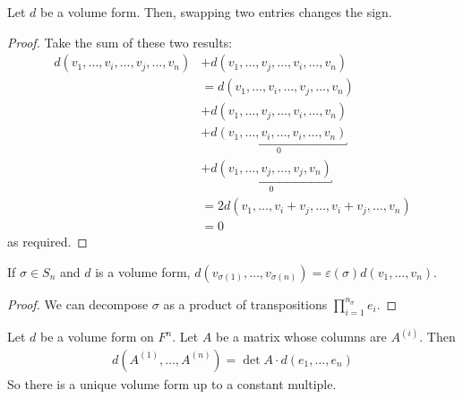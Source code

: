 \begin{lemma}
	Let $d$ be a volume form.
	Then, swapping two entries changes the sign.
\end{lemma}
\begin{proof}
	Take the sum of these two results:
	\begin{align*}
		d(v_1, \dots, v_i, \dots, v_j, \dots, v_n) & + d(v_1, \dots, v_j, \dots, v_i, \dots, v_n) \\
		& = d(v_1, \dots, v_i, \dots, v_j, \dots, v_n) \\
		& + d(v_1, \dots, v_j, \dots, v_i, \dots, v_n) \\
		& + \underbracket{d(v_1, \dots, v_i, \dots, v_i, \dots, v_n)}_0 \\
		& + \underbracket{d(v_1, \dots, v_j, \dots, v_j, v_n)}_0 \\
		& = 2 d(v_1, \dots, v_i + v_j, \dots, v_i + v_j, \dots, v_n) \\
		& = 0
	\end{align*}
	as required.
\end{proof}
\begin{corollary}
	If $\sigma \in S_n$ and $d$ is a volume form, $d(v_{\sigma(1)}, \dots, v_{\sigma(n)}) = \varepsilon(\sigma) d(v_1, \dots, v_n)$.
\end{corollary}
\begin{proof}
	We can decompose $\sigma$ as a product of transpositions $\prod_{i=1}^{n_\sigma} e_i$.
\end{proof}
\begin{theorem}
	Let $d$ be a volume form on $F^n$.
	Let $A$ be a matrix whose columns are $A^{(i)}$.
	Then
	\begin{align*}
		d(A^{(1)}, \dots, A^{(n)}) = \det A \cdot d(e_1, \dots, e_n)
	\end{align*}
	So there is a unique volume form up to a constant multiple.
\end{theorem}
